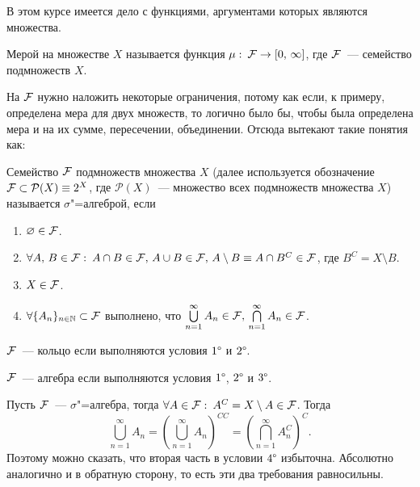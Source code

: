 \newpage
{}

В этом курсе имеется дело с функциями, аргументами которых являются множества.
\begin{definition}
	Мерой на множестве $X$ называется функция
	$\mu:\: \mathcal{F}  \rightarrow [0,\, \infty]$, где $\mathcal{F} $~--- семейство подмножеств $X$.
\end{definition}

На $\mathcal{F} $ нужно наложить некоторые ограничения, потому как если, к примеру, определена мера для двух множеств,
то логично было бы, чтобы была определена мера и на их сумме, пересечении, объединении. Отсюда вытекают такие понятия как:

\begin{definition}
	Семейство $\mathcal{F} $ подмножеств множества $X$ (далее используется обозначение $\mathcal{F}  \subset \mathcal{P} (X)\equiv 2^{X}$, где
	$\mathcal{P} (X)$~--- множество всех подмножеств множества $X$) называется $\sigma$"=алгеброй, если
	\begin{enumerate}[label=\arabic*\degree.]
		\item $\varnothing\in \mathcal{F} $.
		\item $\forall A,\, B\in\mathcal{F} :\: A\cap B\in\mathcal{F} ,\,A\cup B\in\mathcal{F} ,\, A\setminus B\equiv A\cap B^C\in\mathcal{F} $, где
		      $B^C=X\setminus B$.
		\item $X\in\mathcal{F} $.
		\item $\forall \{A_n\}_{n\in\mathbb{N}}\subset\mathcal{F} $ выполнено, что
		      $\bigcup\limits_{n=1}^{\infty}A_n\in\mathcal{F} ,\,\bigcap\limits_{n=1}^{\infty}A_n\in\mathcal{F} $.
	\end{enumerate}
\end{definition}

\begin{definition}
	$\mathcal{F} $~--- кольцо если выполняются условия $1\degree$ и $2\degree$.
\end{definition}
\begin{definition}
	$\mathcal{F} $~--- алгебра если выполняются условия $1\degree$, $2\degree$ и $3\degree$.
\end{definition}

\begin{remark}
	Пусть $\mathcal{F} $~--- $\sigma$"=алгебра, тогда $\forall A\in\mathcal{F} :\: A^C=X\setminus A\in\mathcal{F} $. Тогда
	\[
		\bigcup\limits_{n=1}^{\infty}A_n=\left(\bigcup\limits_{n=1}^{\infty}A_n\right)^{CC}=
		\left(\bigcap\limits_{n=1}^{\infty}A_n^C\right)^C.
	\]
	Поэтому можно сказать, что вторая часть в условии $4\degree$ избыточна. Абсолютно аналогично и в обратную сторону,
	то есть эти два требования равносильны.
	\label{lect1remark1}
\end{remark}

